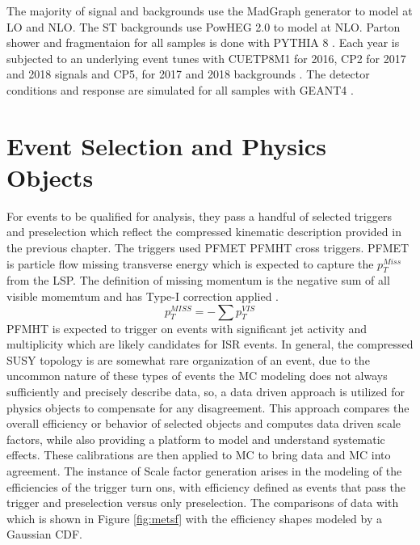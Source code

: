 
The majority of signal and backgrounds use the MadGraph \cite{Alwall:2011uj} generator to model at LO and NLO. The ST backgrounds use PowHEG 2.0 \cite{Alioli:2010xd} to model at NLO. Parton shower and fragmentaion for all samples is done with PYTHIA 8 \cite{Sjostrand:2014zea}. Each year is subjected to an underlying event tunes with CUETP8M1 for 2016, CP2 for 2017 and 2018 signals and CP5, for 2017 and 2018 backgrounds \cite{CMS:2015wcf}\cite{CMS:2019csb}. The detector conditions and response are simulated for all samples with GEANT4 \cite{GEANT4:2002zbu}.
 
\section{Event Selection and Physics Objects}
 For events to be qualified for analysis, they pass a handful of selected triggers and preselection which reflect the compressed kinematic description provided in the previous chapter. The triggers used PFMET PFMHT cross triggers. PFMET is particle flow missing transverse energy which is expected to capture the $p_T^{Miss}$ from the LSP. The definition of missing momentum is the negative sum of all visible momemtum and has Type-I correction applied \cite{CMS:2008oxa}. 
\begin{equation}
p_T^{MISS} = -\sum{p_T^{VIS}}
\end{equation} 
PFMHT is expected to trigger on events with significant jet activity and multiplicity which are likely candidates for ISR events.  In general, the compressed SUSY topology is are somewhat rare organization of an event, due to the uncommon nature of these types of events the MC modeling does not always sufficiently and precisely describe data, so,  a data driven approach is utilized for physics objects to compensate for any disagreement. This approach compares the overall efficiency or behavior of selected objects and computes data driven scale factors, while also providing a platform to model and understand systematic effects. These calibrations are then applied to MC to bring data and MC into agreement. The instance of Scale factor generation arises in the modeling of the efficiencies of the trigger turn ons, with efficiency defined as events that pass the trigger and preselection versus only preselection. The comparisons of data with  which is shown in Figure \ref{fig:metsf} with the efficiency shapes modeled by a Gaussian CDF.  

